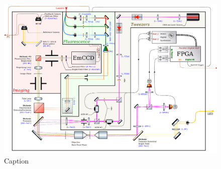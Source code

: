 \begin{figure}
    \includegraphics[width=1.0\linewidth]{images/Setup.pdf}
    \caption{Caption}
    \label{fig:setup}
\end{figure}

